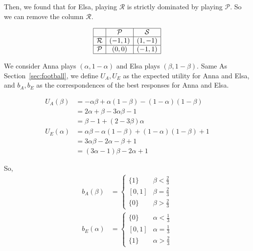 \documentclass{article}
\begin{document}
    Then, we found that for Elsa, playing $\mathcal{R}$ is strictly dominated by playing $\mathcal{P}$. So we can remove the column $\mathcal{R}$. 

    \[
    \begin{array}{|c|c|c|c|}
    \hline
     & \mathcal{P} & \mathcal{S} \\ \hline
    \mathcal{R} & (-1,1) & (1,-1) \\ \hline
    \mathcal{P} & (0,0) & (-1,1) \\ \hline
    \end{array}
    \]

    We consider Anna plays $(\alpha, 1-\alpha)$ and Elsa plays $(\beta, 1-\beta)$. Same As Section~\ref{sec:football}, we define $U_A, U_E$ as the expected utility for Anna and Elsa, and $b_A, b_E$ as the correspondences of the best responses for Anna and Elsa.
    
    \begin{align*}
        U_A(\beta) &= -\alpha\beta+\alpha(1-\beta)-(1-\alpha)(1-\beta)\\
        &=2\alpha+\beta-3\alpha\beta-1\\
        &=\beta-1+(2-3\beta)\alpha\\
        U_E(\alpha) &= \alpha\beta-\alpha(1-\beta)+(1-\alpha)(1-\beta)+1\\
        &=3\alpha\beta-2\alpha-\beta+1\\
        &=(3\alpha-1)\beta-2\alpha+1
    \end{align*}

    So,
    \begin{align*}
        b_A(\beta)&=\begin{cases}
            \{1\}&\beta<\frac{2}{3}\\
            [0, 1]&\beta=\frac{2}{3}\\
            \{0\}&\beta>\frac{2}{3}
        \end{cases}\\
        b_E(\alpha)&=\begin{cases}
            \{0\}&\alpha<\frac{1}{3}\\
            [0, 1]&\alpha=\frac{1}{3}\\
            \{1\}&\alpha>\frac{2}{3}
        \end{cases}
    \end{align*}
\end{document}
